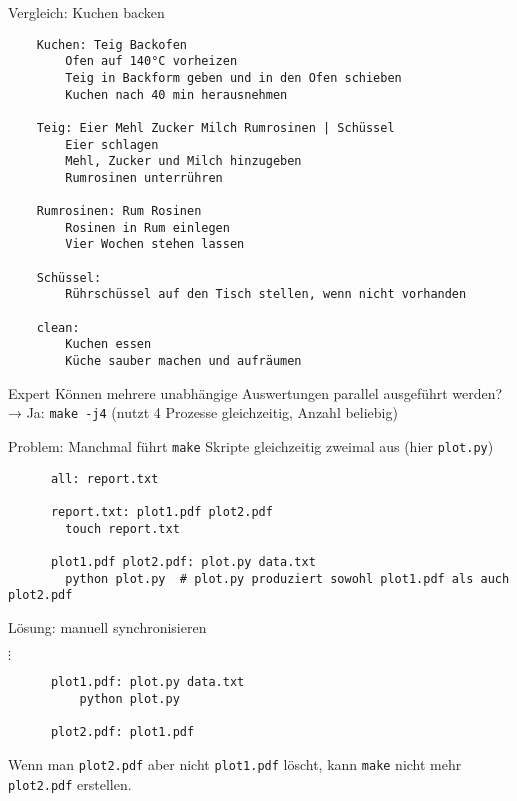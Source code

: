 
\begin{frame}[fragile]{Vergleich: Kuchen backen}
  \begin{center}
    \begin{verbatim}
    Kuchen: Teig Backofen
        Ofen auf 140°C vorheizen
        Teig in Backform geben und in den Ofen schieben
        Kuchen nach 40 min herausnehmen

    Teig: Eier Mehl Zucker Milch Rumrosinen | Schüssel
        Eier schlagen
        Mehl, Zucker und Milch hinzugeben
        Rumrosinen unterrühren

    Rumrosinen: Rum Rosinen
        Rosinen in Rum einlegen
        Vier Wochen stehen lassen

    Schüssel:
        Rührschüssel auf den Tisch stellen, wenn nicht vorhanden

    clean:
        Kuchen essen
        Küche sauber machen und aufräumen
    \end{verbatim}
  \end{center}
\end{frame}

\begin{frame}[fragile]{Expert}
  Können mehrere unabhängige Auswertungen parallel ausgeführt werden? \\
  → Ja: \;\texttt{make -j4}\; (nutzt 4 Prozesse gleichzeitig, Anzahl beliebig)

  Problem: Manchmal führt \texttt{make} Skripte gleichzeitig zweimal aus (hier \texttt{plot.py})
  \begin{center}
    \begin{verbatim}
      all: report.txt

      report.txt: plot1.pdf plot2.pdf
        touch report.txt

      plot1.pdf plot2.pdf: plot.py data.txt
        python plot.py  # plot.py produziert sowohl plot1.pdf als auch plot2.pdf
    \end{verbatim}
  \end{center}

  Lösung: manuell synchronisieren
  \begin{center}
    $\vdots$ \\
    \begin{verbatim}
      plot1.pdf: plot.py data.txt
          python plot.py

      plot2.pdf: plot1.pdf
    \end{verbatim}
  \end{center}

  Wenn man \texttt{plot2.pdf} aber nicht \texttt{plot1.pdf} löscht, kann \texttt{make} nicht mehr \texttt{plot2.pdf} erstellen.
\end{frame}
